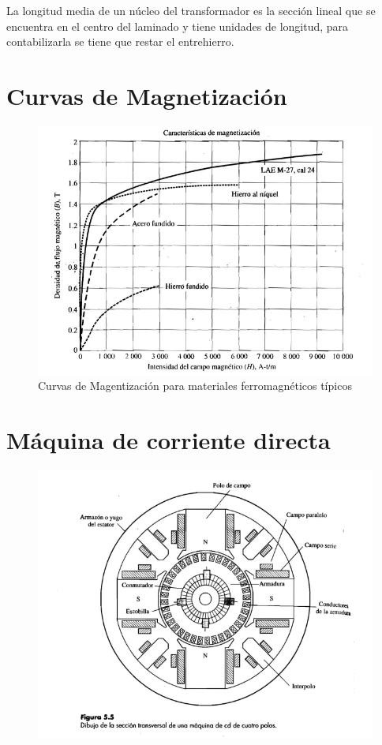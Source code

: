 \documentclass[]{article}
\begin{document}
La longitud media de un núcleo del transformador es la sección lineal que se encuentra en el centro del laminado y tiene unidades de longitud, para contabilizarla se tiene que restar el entrehierro.\\


\section{Curvas de Magnetización}

\begin{figure}[h!]
	\centering
	\includegraphics[width=1\textwidth]{curvasMagnetizacion}
	\caption{Curvas de Magentización para materiales ferromagnéticos típicos}
	\label{curvasMag}
\end{figure}




\section{Máquina de corriente directa}


\begin{figure}[h!]
	\centering
	\includegraphics[width=1\textwidth]{maquina4polos}
	\caption{}
	\label{maq4polos}
\end{figure}
\end{document}
